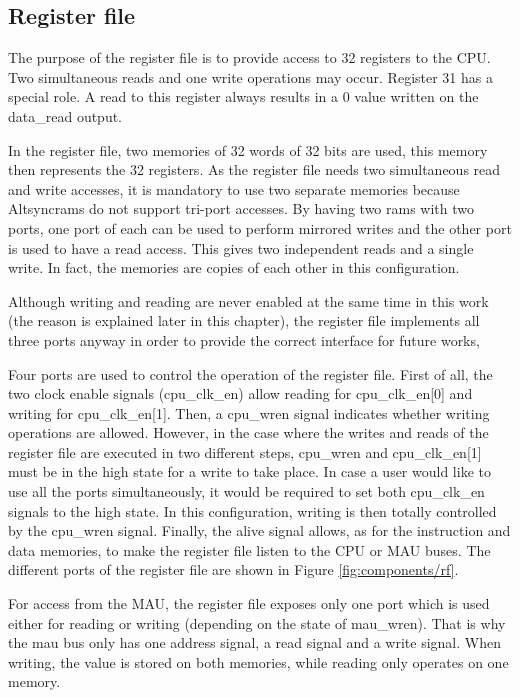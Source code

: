\subsection{Register file}

The purpose of the register file is to provide access to 32 registers to the CPU. Two simultaneous reads and one 
write operations may occur.  Register 31 has a special role. A read to this register always results in a 0
value written on the data\_read output.

In the register file, two memories of 32 words of 32 bits are used, this memory then represents 
the 32 registers. As the register file needs two simultaneous read and write accesses, it is
mandatory to use two separate memories because Altsyncrams do not support tri-port accesses.
By having two rams with two ports, one port of each can be used to perform mirrored writes and the 
other port is used to have a read access. This gives two independent reads and a single write. In 
fact, the memories are copies of each other in this configuration.

Although writing and reading are never enabled at the same time in this work (the reason is explained
later in this chapter), the register file implements all three 
ports anyway in order to provide the correct interface for future works, 

Four ports are used to control the operation of the register file. First of all, the 
two clock enable signals (cpu\_clk\_en) allow reading for cpu\_clk\_en[0] and writing for cpu\_clk\_en[1].  Then, 
a cpu\_wren signal indicates whether writing operations are allowed. However, in the case where the writes and 
reads of the register file are executed in two different steps, cpu\_wren and cpu\_clk\_en[1] must be in the 
high state for a write to take place. In case a user would like to use all the ports simultaneously, 
it would be required to set both cpu\_clk\_en signals to the high state. In this configuration, writing 
is then totally controlled by the cpu\_wren signal. Finally, the alive signal allows, as for the instruction and 
data memories, to make the register file listen to the CPU or MAU buses. The different ports of the register file 
are shown in Figure \ref{fig:components/rf}.

For access from the MAU, the register file exposes only one port which is used either for 
reading or writing (depending on the state of mau\_wren). That is why the mau bus only has one 
address signal, a read signal and a write signal. When writing, the value is stored on 
both memories, while reading only operates on one memory.

